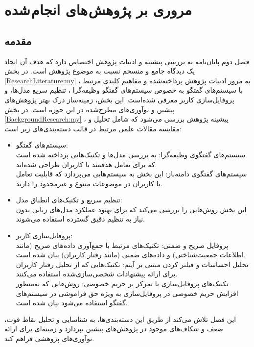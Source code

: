 \chapter{مروری بر پژوهش های انجام شده}
\section{مقدمه}
فصل دوم پایان‌نامه به 
بررسی پیشینه%
 و 
ادبیات پژوهش%
 اختصاص دارد که هدف آن ایجاد یک دیدگاه جامع و منسجم نسبت به موضوع پژوهش است. در بخش 
\ref{ResearchLiterature:my}
، به مرور ادبیات پژوهش پرداخته‌شده و مفاهیم کلیدی مرتبط با سیستم‌های گفتگو به خصوص سیستم‌های گفتگو وظیفه‌گرا ، تنظیم سریع مدل‌ها، و پروفایل‌سازی کاربر معرفی شده‌است. این بخش، زمینه‌ساز درک بهتر پژوهش‌های پیشین و نوآوری‌های مطرح‌شده در این حوزه است. در بخش 
\ref{BackgroundResearch:my}
، پیشینه پژوهش بررسی می‌شود که شامل تحلیل و مقایسه مقالات علمی مرتبط در قالب دسته‌بندی‌های زیر است:
\begin{itemize}
\item
 سیستم‌های گفتگو:\\
سیستم‌های گفتگوی وظیفه‌گرا: به بررسی مدل‌ها و تکنیک‌هایی پرداخته شده است که برای تعامل هدفمند با کاربران طراحی شده‌اند.\\
سیستم‌های گفتگوی دامنه‌باز: این بخش به سیستم‌هایی می‌پردازد که قابلیت تعامل با کاربران در موضوعات متنوع و غیرمحدود را دارند.
\item
تنظیم سریع و تکنیک‌های انطباق مدل:\\
این بخش روش‌هایی را بررسی می‌کند که برای بهبود عملکرد مدل‌های زبانی بدون نیاز به تنظیم دقیق گسترده استفاده می‌شوند.
\item
پروفایل‌سازی کاربر:\\
پروفایل صریح و ضمنی: تکنیک‌های مرتبط با جمع‌آوری داده‌های صریح (مانند اطلاعات جمعیت‌شناختی) و داده‌های ضمنی (مانند رفتار کاربران) بیان شده است.\\
تحلیل احساسات و فیلتر کردن مبتنی بر آیتم: تکنیک‌هایی که از تحلیل رفتار کاربران برای ارائه پیشنهادات شخصی‌سازی‌شده استفاده می‌کنند.\\
تکنیک‌های پروفایل‌سازی با تمرکز بر حریم خصوصی: روش‌هایی که به‌منظور افزایش حریم خصوصی در پروفایل‌سازی به ویژه حق فراموشی در سیستم‌های گفتگو استفاده می‌شود بیان شده است.

\end{itemize}
این فصل تلاش می‌کند از طریق این دسته‌بندی‌ها، به شناسایی و تحلیل نقاط قوت، ضعف و شکاف‌های موجود در پژوهش‌های پیشین بپردازد و زمینه‌ای برای ارائه نوآوری‌های پژوهشی فراهم کند.

